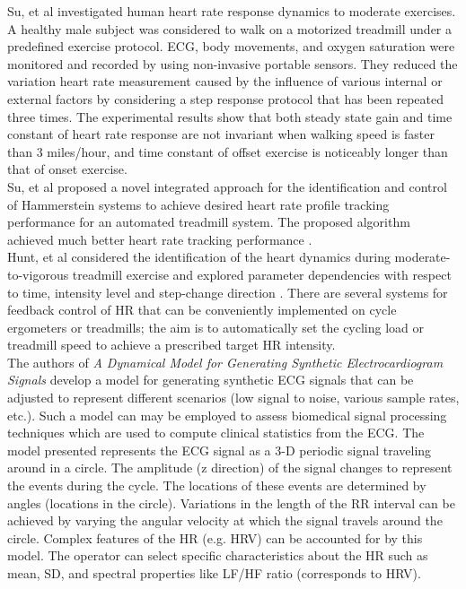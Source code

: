 \documentclass[paper=a4, fontsize=11pt]{scrartcl}
\numberwithin{equation}{section}		%
\numberwithin{figure}{section}			%
\numberwithin{table}{section}		    %
\begin{document}
Su, et al \cite{su2010dynamic} investigated human heart rate response dynamics to moderate 
exercises. A healthy male subject was considered to walk on a motorized treadmill under a predefined
exercise protocol. ECG, body movements, and oxygen saturation were monitored and recorded by using 
non-invasive portable sensors.  They reduced the variation heart rate measurement caused by the 
influence of various internal or external factors by considering a step response protocol that has 
been repeated three times. The experimental results show that both steady state gain and time 
constant of heart rate response are not invariant when walking speed is faster than 3 miles/hour, 
and time constant of offset exercise is noticeably longer than that of onset exercise.\\

Su, et al proposed a novel integrated approach for the identification and control of Hammerstein 
systems to achieve desired heart rate profile tracking performance for an automated treadmill 
system. The proposed algorithm achieved much better heart rate tracking performance 
\cite{su2007identification}.\\

Hunt, et al considered the identification of the heart dynamics during moderate-to-vigorous 
treadmill exercise and explored parameter dependencies with respect to time, intensity level and 
step-change direction \cite{su2007identification}. There are several systems for feedback control of
HR that can be conveniently implemented on cycle ergometers \cite{paradiso2013experimental} or 
treadmills; the aim is to automatically set the cycling load or treadmill speed to achieve a 
prescribed target HR intensity.\\

The authors of \emph{A Dynamical Model for Generating Synthetic Electrocardiogram Signals} 
\cite{mcsharry2003dynamical} develop a model for generating synthetic ECG signals that can be 
adjusted to represent different scenarios (low signal to noise, various sample rates, etc.).
Such a model can may be employed to assess biomedical signal processing techniques which are used 
to compute clinical statistics from the ECG. The model presented represents the ECG signal as a 3-D 
periodic signal traveling around in a circle. The amplitude (z direction) of the signal changes to 
represent the events during the cycle. The locations of these events are determined by angles 
(locations in the circle). Variations in the length of the RR interval can be achieved by varying 
the angular velocity at which the signal travels around the circle. Complex features of the HR 
(e.g. HRV) can be accounted for by this model. The operator can select specific characteristics 
about the HR such as mean, SD, and spectral properties like LF/HF ratio (corresponds to HRV).\\
\end{document}
